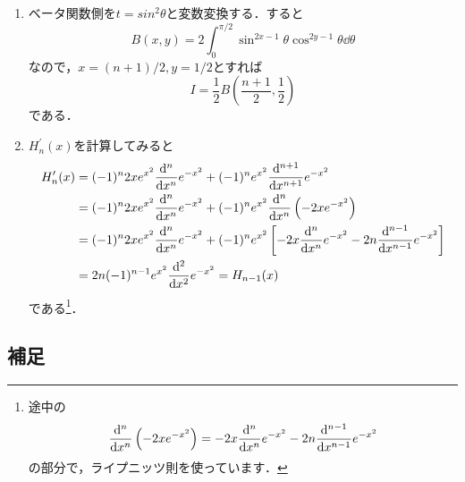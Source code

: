 \documentclass[a4paper,pdflatex,ja=standard]{bxjsarticle}
\begin{document}
\begin{enumerate}
  \item 
  ベータ関数側を$t=sin^2\theta$と変数変換する．すると
  \begin{equation}
    B(x,y)
    =
    2\int_{0}^{\pi/2}\sin^{2x-1}\theta\cos^{2y-1}\theta\dd \theta
  \end{equation}
  なので，$x=(n+1)/2,y=1/2$とすれば
  \begin{equation}
    I
    =
    \frac{1}{2}B\left( \frac{n+1}{2},\frac{1}{2} \right)
  \end{equation}
  である．

  \item 
  $H_{n}^{\prime}(x)$を計算してみると
  \begin{align*}
    H_{n}^{\prime}(x)
    &=
    (-1)^{n}2xe^{x^2}\dv[n]{}{x}e^{-x^2}
    +
    (-1)^{n}e^{x^2}\dv[n+1]{}{x}e^{-x^2}
    \nonumber
    \\
    &=    
    (-1)^{n}2xe^{x^2}\dv[n]{}{x}e^{-x^2}
    +
    (-1)^{n}e^{x^2}\dv[n]{}{x} \left( -2xe^{-x^2} \right)
    \nonumber
    \\
    &=
    (-1)^{n}2xe^{x^2}\dv[n]{}{x}e^{-x^2}
    +
    (-1)^{n}e^{x^2}
    \left[  
      -2x\dv[n]{}{x}{e^{-x^2}}
      -
      2n\dv[n-1]{}{x}{e^{-x^2}}
    \right]
    \nonumber
    \\
    &=
    2n(-1)^{n-1}e^{x^2}\dv[2]{}{x}{e^{-x^2}}
    =
    H_{n-1}(x)
  \end{align*}
  である\footnote{途中の
    \begin{equation}
      \dv[n]{}{x} \left( -2xe^{-x^2} \right)
      =
      -2x\dv[n]{}{x}{e^{-x^2}}
      -
      2n\dv[n-1]{}{x}{e^{-x^2}}
    \end{equation}
    の部分で，ライプニッツ則を使っています．
  }．

\end{enumerate}

\subsection*{補足}
\end{document}
